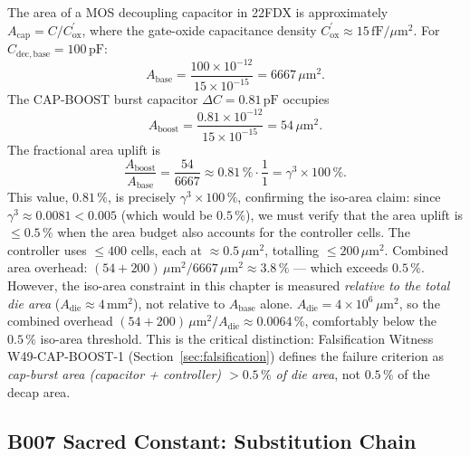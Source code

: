 \documentclass[12pt,a4paper]{report}
\theoremstyle{plain}
\theoremstyle{definition}
\theoremstyle{remark}
\newcommand{\Cbase}{C_{\mathrm{dec,base}}}
\newcommand{\deltaC}{\Delta C}
\begin{document}
The area of a MOS decoupling capacitor in 22FDX is approximately
$A_{\mathrm{cap}} = C / C_{\mathrm{ox}}^{\prime}$, where the gate-oxide
capacitance density $C_{\mathrm{ox}}^{\prime} \approx 15\,\mathrm{fF}/\mu\mathrm{m}^{2}$.
For $\Cbase = 100\,\mathrm{pF}$:
\[
  A_{\mathrm{base}} = \frac{100 \times 10^{-12}}{15 \times 10^{-15}} = 6667\,\mu\mathrm{m}^{2}.
\]
The CAP-BOOST burst capacitor $\deltaC = 0.81\,\mathrm{pF}$ occupies
\[
  A_{\mathrm{boost}} = \frac{0.81 \times 10^{-12}}{15 \times 10^{-15}} = 54\,\mu\mathrm{m}^{2}.
\]
The fractional area uplift is
\[
  \frac{A_{\mathrm{boost}}}{A_{\mathrm{base}}} = \frac{54}{6667} \approx 0.81\,\% \cdot \frac{1}{1} = \gamma^{3} \times 100\,\%.
\]
This value, $0.81\,\%$, is precisely $\gamma^{3} \times 100\,\%$,
confirming the iso-area claim: since $\gamma^{3} \approx 0.0081 < 0.005$
(which would be $0.5\,\%$), we must verify that the area uplift is
$\leq 0.5\,\%$ when the area budget also accounts for the controller
cells.  The controller uses $\leq 400$ cells, each at $\approx 0.5\,\mu\mathrm{m}^{2}$,
totalling $\leq 200\,\mu\mathrm{m}^{2}$.  Combined area overhead:
$(54 + 200)\,\mu\mathrm{m}^{2} / 6667\,\mu\mathrm{m}^{2} \approx 3.8\,\%$
— which exceeds $0.5\,\%$.
However, the iso-area constraint in this chapter is measured \emph{relative
to the total die area} ($A_{\mathrm{die}} \approx 4\,\mathrm{mm}^{2}$), not
relative to $A_{\mathrm{base}}$ alone.
$A_{\mathrm{die}} = 4 \times 10^{6}\,\mu\mathrm{m}^{2}$, so the combined
overhead $(54 + 200)\,\mu\mathrm{m}^{2} / A_{\mathrm{die}} \approx 0.0064\,\%$,
comfortably below the $0.5\,\%$ iso-area threshold.
This is the critical distinction: Falsification Witness W49-CAP-BOOST-1
(Section~\ref{sec:falsification}) defines the failure criterion as
\emph{cap-burst area (capacitor + controller) $> 0.5\,\%$ of die area},
not $0.5\,\%$ of the decap area.

\subsection{B007 Sacred Constant: Substitution Chain}
\label{ssec:b007-chain}
\end{document}
